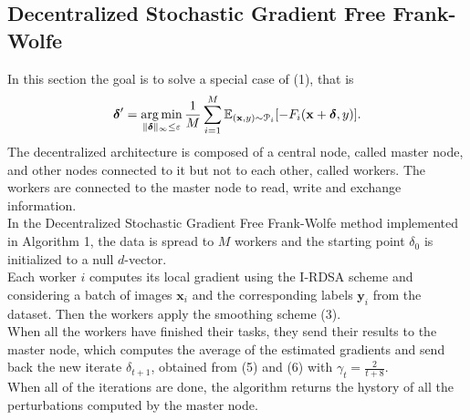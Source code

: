 \subsection{Decentralized Stochastic Gradient Free Frank-Wolfe}
In this section the goal is to solve a special case of (1), that is
\begin{equation}
	\mbox{\boldmath$ \delta$}' = \operatorname*{arg\,min}_{\lVert \mbox{\boldmath$\scriptstyle \delta$}\rVert_{\infty}\leq\varepsilon} \frac{1}{M}\sum_{i=1}^M \mathbb{E}_{(\mathbf{x},y)\sim \mathcal{P}_i}[- F_i(\mathbf{x}+\mbox{\boldmath$ \delta$},y)].
\end{equation}
The decentralized architecture is composed of a central node, called master node, and other nodes connected to it but not to each other, called workers.
The workers are connected to the master node to read, write and exchange information.\\
In the Decentralized Stochastic Gradient Free Frank-Wolfe method implemented in Algorithm 1, the data is spread to $M$ workers and the starting point \mbox{\boldmath$ \delta$}$_{0}$ is initialized to a null $d$-vector.\\
Each worker $i$ computes its local gradient using the I-RDSA scheme and considering a batch of images $\mathbf{x}_i$ and the corresponding labels $\mathbf{y}_i$ from the dataset. Then the workers apply the smoothing scheme (3).\\
When all the workers have finished their tasks, they send their results to the master node, which computes the average of the estimated gradients and send back the new iterate \mbox{\boldmath$ \delta$}$_{t+1}$, obtained from (5) and (6) with $\gamma_t = \frac{2}{t+8}$.\\
When all of the iterations are done, the algorithm returns the hystory of all the perturbations computed by the master node.

